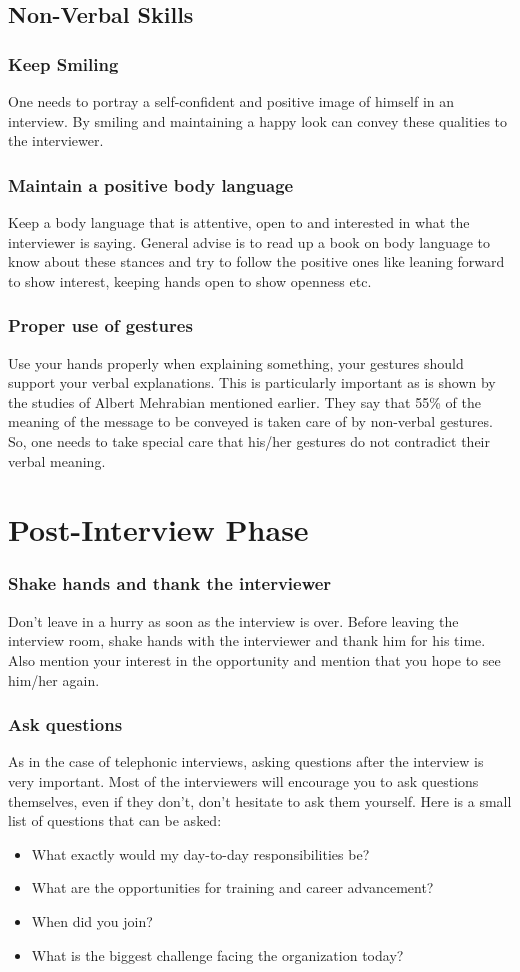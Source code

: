 \documentclass[a4paper,12pt]{report}
\begin{document}
\subsection{Non-Verbal Skills}
\subsubsection{Keep Smiling}
One needs to portray a self-confident and positive image of himself in an interview. By smiling and maintaining
a happy look can convey these qualities to the interviewer.
\subsubsection{Maintain a positive body language}
Keep a body language that is attentive, open to and interested in what the interviewer is saying. General advise is to
read up a book on body language to know about these stances and try to follow the positive ones like leaning 
forward to show interest, keeping hands open to show openness etc.
\subsubsection{Proper use of gestures}
Use your hands properly when explaining something, your gestures should support your verbal explanations.
This is particularly important as is shown by the studies of Albert Mehrabian mentioned earlier. They say that 
55\% of the meaning of the message to be conveyed is taken care of by non-verbal gestures. So, one needs to
take special care that his/her gestures do not contradict their verbal meaning.
\section{Post-Interview Phase}
\subsubsection{Shake hands and thank the interviewer}
Don't leave in a hurry as soon as the interview is over.
Before leaving the interview room, shake hands with the interviewer and thank him for his time. Also mention 
your interest in the opportunity and mention that you hope to see him/her again.
\subsubsection{Ask questions}
As in the case of telephonic interviews, asking questions after the interview is very important. Most of the interviewers
will encourage you to ask questions themselves, even if they don't, don't hesitate to ask them yourself.
Here is a small list of questions that can be asked\cite{lifehack}:
\begin{itemize}
 \item What exactly would my day-to-day responsibilities be?
 \item What are the opportunities for training and career advancement?
 \item When did you join?
 \item What is the biggest challenge facing the organization today?
\end{itemize}
\end{document}
